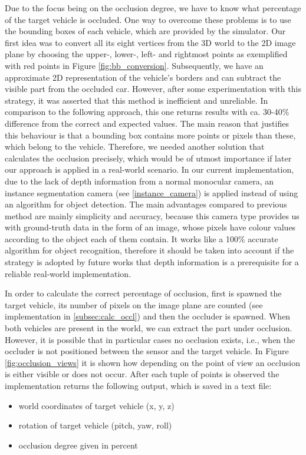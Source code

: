 Due to the focus being on the occlusion degree, we have to know what percentage of the target vehicle is occluded. One way to overcome these problems is to use the bounding boxes of each vehicle, which are provided by the simulator. Our first idea was to convert all its eight vertices from the 3D world to the 2D image plane by choosing the upper-, lower-,  left- and rightmost points as exemplified with red points in Figure \ref{fig:bb_conversion}. Subsequently, we have an approximate 2D representation of the vehicle's borders and can subtract the visible part from the occluded car. However, after some experimentation with this strategy, it was asserted that this method is inefficient and unreliable. In comparison to the following approach, this one returns results with ca. 30-40\% difference from the correct and expected values. The main reason that justifies this behaviour is that a bounding box contains more points or pixels than these, which belong to the vehicle. Therefore, we needed another solution that calculates the occlusion precisely, which would be of utmost importance if later our approach is applied in a real-world scenario.
In our current implementation, due to the lack of depth information from a normal monocular camera, an instance segmentation camera (see \ref{instance_camera}) is applied instead of using an algorithm for object detection. The main advantages compared to previous method are mainly simplicity and accuracy, because this camera type provides us with ground-truth data in the form of an image, whose pixels have colour values according to the object each of them contain. It works like a 100\% accurate algorithm for object recognition, therefore it should be taken into account if the strategy is adopted by future works that depth information is a prerequisite for a reliable real-world implementation.

In order to calculate the correct percentage of occlusion, first is spawned the target vehicle, its number of pixels on the image plane are counted (see implementation in \ref{subsec:calc_occl}) and then the occluder is spawned. When both vehicles are present in the world, we can extract the part under occlusion. However, it is possible that in particular cases no occlusion exists, i.e., when the occluder is not positioned between the sensor and the target vehicle. In Figure \ref{fig:occlusion_views} it is shown how depending on the point of view an occlusion is either visible or does not occur. After each tuple of points is observed the implementation returns the following output, which is saved in a text file:
\begin{itemize}
    \item world coordinates of target vehicle (x, y, z)
    \item rotation of target vehicle (pitch, yaw, roll)
    \item occlusion degree given in percent
\end{itemize}

